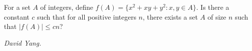 For a set $A$ of integers, define $f(A)=\{x^2+xy+y^2: x,y\in A\}$. Is there a constant $c$ such that for all positive integers $n$, there exists a set $A$ of size $n$ such that $|f(A)|\le cn$?

\textit{David Yang.}